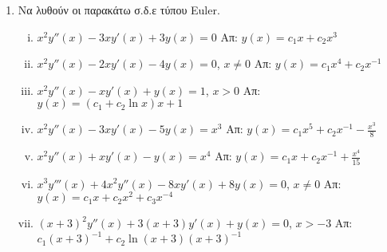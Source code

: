 \begin{enumerate}
  \item Να λυθούν οι παρακάτω σ.δ.ε τύπου Euler.
    \begin{enumerate}[i)]
      \item $ x^{2}y''(x)-3xy'(x)+3y(x)=0 $ \hfill Απ: $ y(x)=c_{1}x + c_{2}x^{3} $
      \item $ x^{2}y''(x)-2xy'(x)-4y(x)=0 $,\; $ x \neq 0 $ \hfill Απ: $
        y(x)=c_{1}x^{4}+ c_{2} x^{-1} $ 
      \item $ x^{2}y''(x)-xy'(x)+y(x)=1 $,\; $ x>0 $ \hfill Απ: $ y(x)=(c_{1}+c_{2}
        \ln{x})x + 1 $  
      \item $ x^{2}y''(x)-3xy'(x)-5y(x)=x^{3} $ \hfill Απ: $ y(x)=c_{1}x^{5}+ c_{2}
        x^{-1}- \frac{x^{3}}{8} $ 
      \item $ x^{2}y''(x)+xy'(x)-y(x)=x^{4} $ \hfill Απ: $ y(x)=c_{1}x+c_{2}x^{-1}+
        \frac{x^{4}}{15} $ 
      \item $ x^{3}y'''(x)+4x^{2}y''(x)-8xy'(x)+8y(x)=0 $,\; $ x \neq 0 $ \hfill Απ:
        $y(x)=c_{1}x+c_{2}x^{2}+c_{3}x^{-4}$ 
      \item \label{eul} $ (x+3)^{2}y''(x)+3(x+3)y'(x)+y(x)=0 $,\; $ x>-3 $ \hfill Απ:
        $ c_{1}
        (x+3)^{-1} + c_{2}\ln(x+3)(x+3)^{-1} $
    \end{enumerate}
\end{enumerate}




